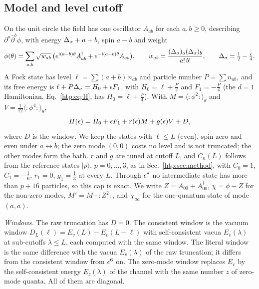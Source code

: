 \subsection{Model and level cutoff}\label{htp:d2:model}
On the unit circle the field has one oscillator $A_{ab}$ for each $a,b\ge0$, describing $\partial^a\bar\partial^b\phi$, with
energy $\Delta_\sigma+a+b$, spin $a-b$ and weight
\begin{equation}
 \phi(\theta)=\sum_{a,b}\sqrt{w_{ab}}\,\big(e^{\mathrm i(a-b)\theta}A^\dagger_{ab}+e^{-\mathrm i(a-b)\theta}A_{ab}\big),\qquad
 w_{ab}=\frac{(\Delta_\sigma)_a(\Delta_\sigma)_b}{a!\,b!},\qquad \Delta_\sigma=\tfrac12-\tfrac{\epsilon}4 .
 \label{htp:d2:eq:modes}
\end{equation}
A Fock state has level $\ell=\sum(a+b)\,n_{ab}$ and particle number $P=\sum n_{ab}$, and its free energy is
$\ell+P\Delta_\sigma=H_0+\epsilon F_1$, with $H_0=\ell+\frac P2$ and $F_1=-\frac P4$ (the $d=1$ Hamiltonian, Eq.~\eqref{htp:eq:H}, has $H_0=\ell+\frac P4$). With
$M=\langle{:}\phi^2{:}\rangle_\theta$ and $V=\frac1{12}\langle{:}\phi^4{:}\rangle_\theta$,
\begin{equation}
 H(\epsilon)=H_0+\epsilon F_1+r(\epsilon)M+g(\epsilon)V+D ,
 \label{htp:d2:eq:H}
\end{equation}
where $D$ is the window. We keep the states with $\ell\le L$ (even), spin zero and even under $a\leftrightarrow b$; the zero mode
$(0,0)$ costs no level and is not truncated; the other modes form the bath. $r$ and $g$ are tuned at cutoff $L$, and $C_n(L)$ follows from the reference
states $|p\rangle$, $p=0,\dots,3$, as in Sec.~\ref{htp:sec:method}, with $C_0=1$, $C_1=-\frac16$, $r_1=0$, $g_1=\frac13$ at every $L$.
Through $\epsilon^8$ no intermediate state has more than $p+16$ particles, so this cap is exact. We write $Z=A_{00}+A_{00}^\dagger$,
$\chi=\phi-Z$ for the non-zero modes, $M'=M-{:}Z^2{:}$, and $\chi_{aa}$ for the one-quantum state of mode $(a,a)$.

\emph{Windows.} The raw truncation has $D=0$. The consistent window is the vacuum window
$D_L(\ell)=E_v(L)-E_v(L-\ell)$ with self-consistent vacua $E_v(\lambda)$ at sub-cutoffs $\lambda\le L$, each computed
with the same window. The literal window is the same difference with the vacua $E_v(\lambda)$ of the raw truncation; it
differs from the consistent window from $\epsilon^6$ on. The zero-mode window replaces $E_v$ by the self-consistent energy
$E_z(\lambda)$ of the channel with the same number $z$ of zero-mode quanta. All of them are diagonal.

